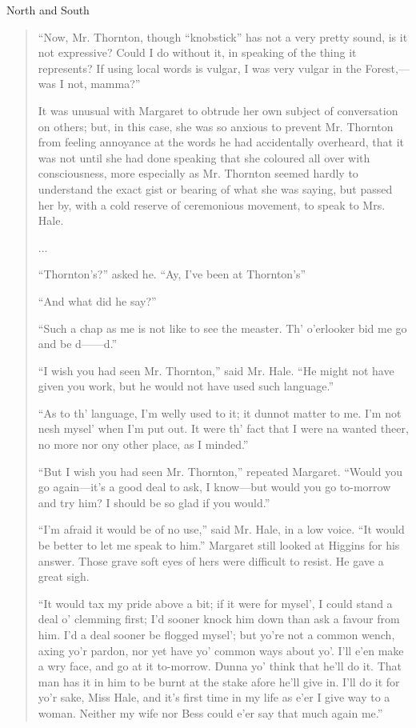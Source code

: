 \begin{texts}{North and South}
\begin{quote}
    ``Now, Mr. Thornton, though ``knobstick'' has not a very pretty sound, is it not expressive? Could I do without it, in speaking of the thing it represents? If using local words is vulgar, I was very vulgar in the Forest,—was I not, mamma?''
    
    It was unusual with Margaret to obtrude her own subject of conversation on others; but, in this case, she was so anxious to prevent Mr. Thornton from feeling annoyance at the words he had accidentally overheard, that it was not until she had done speaking that she coloured all over with consciousness, more especially as Mr. Thornton seemed hardly to understand the exact gist or bearing of what she was saying, but passed her by, with a cold reserve of ceremonious movement, to speak to Mrs. Hale.
    
    ...
    
    ``Thornton's?'' asked he. ``Ay, I've been at Thornton's''
    
    ``And what did he say?''
    
    ``Such a chap as me is not like to see the measter. Th' o'erlooker bid me go and be d——d.''
    
    ``I wish you had seen Mr. Thornton,'' said Mr. Hale. ``He might not have given you work, but he would not have used such language.''
    
    ``As to th' language, I'm welly used to it; it dunnot matter to me. I'm not nesh mysel' when I'm put out. It were th' fact that I were na wanted theer, no more nor ony other place, as I minded.''
    
    ``But I wish you had seen Mr. Thornton,'' repeated Margaret. ``Would you go again—it's a good deal to ask, I know—but would you go to-morrow and try him? I should be so glad if you would.''
    
    ``I'm afraid it would be of no use,'' said Mr. Hale, in a low voice. ``It would be better to let me speak to him.'' Margaret still looked at Higgins for his answer. Those grave soft eyes of hers were difficult to resist. He gave a great sigh.
    
    ``It would tax my pride above a bit; if it were for mysel', I could stand a deal o' clemming first; I'd sooner knock him down than ask a favour from him. I'd a deal sooner be flogged mysel'; but yo're not a common wench, axing yo'r pardon, nor yet have yo' common ways about yo'. I'll e'en make a wry face, and go at it to-morrow. Dunna yo' think that he'll do it. That man has it in him to be burnt at the stake afore he'll give in. I'll do it for yo'r sake, Miss Hale, and it's first time in my life as e'er I give way to a woman. Neither my wife nor Bess could e'er say that much again me.''
    

\end{quote}
\end{texts}
